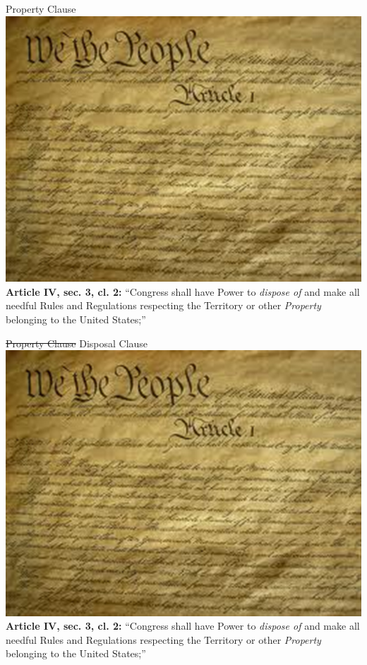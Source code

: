 \begin{frame}{Property Clause}
   \centering
   \includegraphics[height=.7\textheight]{img/constitution.png} \\
   \textbf{Article IV, sec. 3, cl. 2:} ``Congress shall have Power to \emph{dispose of} and make all needful Rules and Regulations respecting the Territory or other \emph{Property} belonging to the United States;''
\end{frame}

\begin{frame}{\st{Property Clause} Disposal Clause}
   \centering
   \includegraphics[height=.7\textheight]{img/constitution.png} \\
   \textbf{Article IV, sec. 3, cl. 2:} ``Congress shall have Power to \emph{dispose of} and make all needful Rules and Regulations respecting the Territory or other \emph{Property} belonging to the United States;''
\end{frame}

